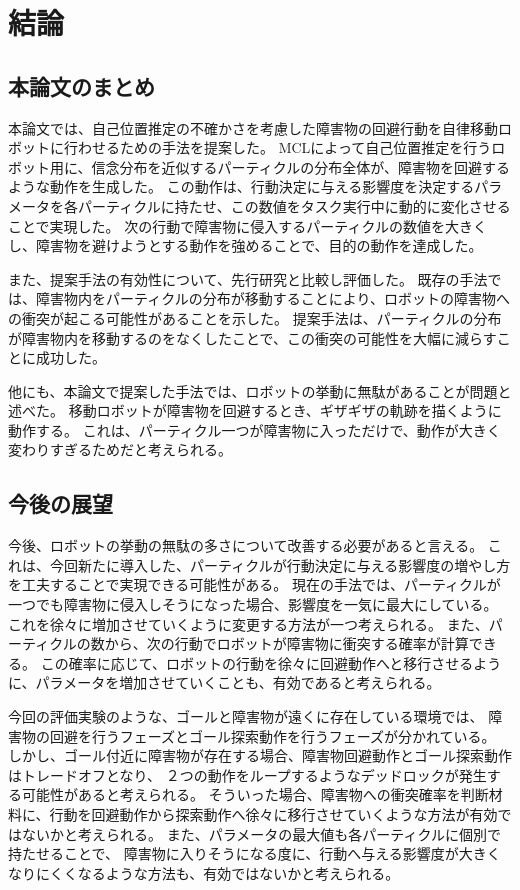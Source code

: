 \chapter{結論} \label{chapter:conclusion}

\section{本論文のまとめ}
本論文では、自己位置推定の不確かさを考慮した障害物の回避行動を自律移動ロボットに行わせるための手法を提案した。
MCLによって自己位置推定を行うロボット用に、信念分布を近似するパーティクルの分布全体が、障害物を回避するような動作を生成した。
この動作は、行動決定に与える影響度を決定するパラメータを各パーティクルに持たせ、この数値をタスク実行中に動的に変化させることで実現した。
次の行動で障害物に侵入するパーティクルの数値を大きくし、障害物を避けようとする動作を強めることで、目的の動作を達成した。

また、提案手法の有効性について、先行研究と比較し評価した。
既存の手法では、障害物内をパーティクルの分布が移動することにより、ロボットの障害物への衝突が起こる可能性があることを示した。
提案手法は、パーティクルの分布が障害物内を移動するのをなくしたことで、この衝突の可能性を大幅に減らすことに成功した。

他にも、本論文で提案した手法では、ロボットの挙動に無駄があることが問題と述べた。
移動ロボットが障害物を回避するとき、ギザギザの軌跡を描くように動作する。
これは、パーティクル一つが障害物に入っただけで、動作が大きく変わりすぎるためだと考えられる。


\section{今後の展望}
今後、ロボットの挙動の無駄の多さについて改善する必要があると言える。
これは、今回新たに導入した、パーティクルが行動決定に与える影響度の増やし方を工夫することで実現できる可能性がある。
現在の手法では、パーティクルが一つでも障害物に侵入しそうになった場合、影響度を一気に最大にしている。
これを徐々に増加させていくように変更する方法が一つ考えられる。
また、パーティクルの数から、次の行動でロボットが障害物に衝突する確率が計算できる。
この確率に応じて、ロボットの行動を徐々に回避動作へと移行させるように、パラメータを増加させていくことも、有効であると考えられる。

今回の評価実験のような、ゴールと障害物が遠くに存在している環境では、
障害物の回避を行うフェーズとゴール探索動作を行うフェーズが分かれている。
しかし、ゴール付近に障害物が存在する場合、障害物回避動作とゴール探索動作はトレードオフとなり、
２つの動作をループするようなデッドロックが発生する可能性があると考えられる。
そういった場合、障害物への衝突確率を判断材料に、行動を回避動作から探索動作へ徐々に移行させていくような方法が有効ではないかと考えられる。
また、パラメータの最大値も各パーティクルに個別で持たせることで、
障害物に入りそうになる度に、行動へ与える影響度が大きくなりにくくなるような方法も、有効ではないかと考えられる。
